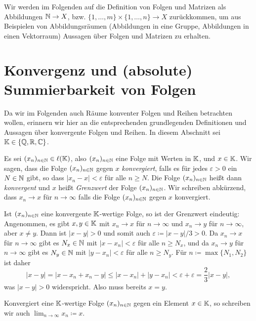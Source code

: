 \begin{bem}
 Wir werden im Folgenden auf die Definition von Folgen und Matrizen als Abbildungen $\mathbb{N} \to X$, bzw. $\{1, \dotsc, m\} \times \{1, \dotsc, n\} \to X$ zurückkommen, um aus Beispielen von Abbildungsräumen (Abbildungen in eine Gruppe, Abbildungen in einen Vektorraum) Aussagen über Folgen und Matrizen zu erhalten.
\end{bem}





\section{Konvergenz und (absolute) Summierbarkeit von Folgen}
Da wir im Folgenden auch Räume konventer Folgen und Reihen betrachten wollen, erinnern wir hier an die entsprechenden grundlegenden Definitionen und Aussagen über konvergente Folgen und Reihen. In diesem Abschnitt sei $\mathbb{K} \in \{\mathbb{Q}, \mathbb{R}, \mathbb{C}\}$.


\begin{defi}
 Es sei $(x_n)_{n \in \mathbb{N}} \in \ell(\mathbb{K})$, also $(x_n)_{n \in \mathbb{N}}$ eine Folge mit Werten in $\mathbb{K}$, und $x \in \mathbb{K}$. Wir sagen, dass die Folge $(x_n)_{n \in \mathbb{N}}$ gegen $x$ \emph{konvergiert}, falls es für jedes $\varepsilon > 0$ ein $N \in \mathbb{N}$ gibt, so dass $|x_n - x| < \varepsilon$ für alle $n \geq N$. Die Folge $(x_n)_{n \in \mathbb{N}}$ heißt dann \emph{konvergent} und $x$ heißt \emph{Grenzwert} der Folge $(x_n)_{n \in \mathbb{N}}$. Wir schreiben abkürzend, dass $x_n \to x$ für $n \to \infty$ falls die Folge $(x_n)_{n \in \mathbb{N}}$ gegen $x$ konvergiert.
\end{defi}


\begin{bem}
 Ist $(x_n)_{n \in \mathbb{N}}$ eine konvergente $\mathbb{K}$-wertige Folge, so ist der Grenzwert eindeutig: Angenommen, es gibt $x,y \in \mathbb{K}$ mit $x_n \to x$ für $n \to \infty$ und $x_n \to y$ für $n \to \infty$, aber $x \neq y$. Dann ist $|x-y| > 0$ und somit auch $\varepsilon \coloneqq |x-y|/3 > 0$. Da $x_n \to x$ für $n \to \infty$ gibt es $N_x \in \mathbb{N}$ mit $|x-x_n| < \varepsilon$ für alle $n \geq N_x$, und da $x_n \to y$ für $n \to \infty$ gibt es $N_y \in \mathbb{N}$ mit $|y-x_n| < \varepsilon$ für alle $n \geq N_y$. Für $n \coloneqq \max \{N_1, N_2\}$ ist daher
 \[
  |x-y|
  = |x-x_n+x_n-y|
  \leq |x - x_n| + |y - x_n|
  < \varepsilon + \varepsilon
  = \frac{2}{3}|x-y|,
 \]
 was $|x-y| > 0$ widerspricht. Also muss bereits $x = y$.
 
 Konvergiert eine $\mathbb{K}$-wertige Folge $(x_n)_{n \in \mathbb{N}}$ gegen ein Element $x \in \mathbb{K}$, so schreiben wir auch $\lim_{n \to \infty} x_n \coloneqq x$.
\end{bem}


